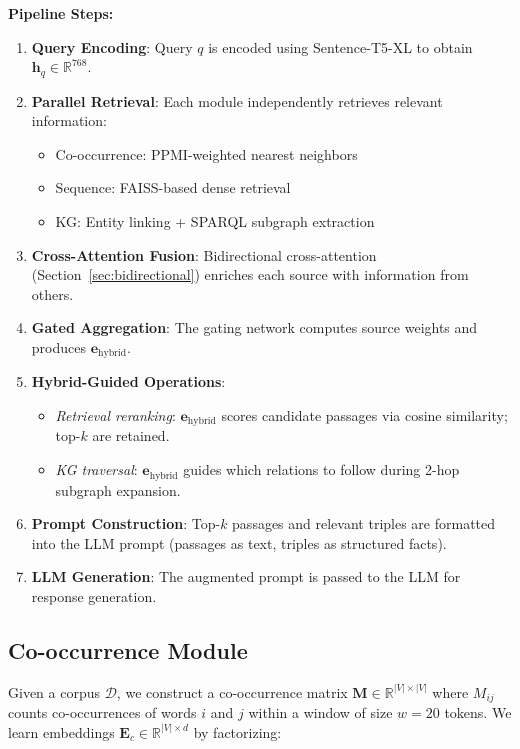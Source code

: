 \documentclass[10pt,twocolumn]{article}
\begin{document}
\textbf{Pipeline Steps:}
\begin{enumerate}
    \item \textbf{Query Encoding}: Query $q$ is encoded using Sentence-T5-XL to obtain $\mathbf{h}_q \in \mathbb{R}^{768}$.
    \item \textbf{Parallel Retrieval}: Each module independently retrieves relevant information:
    \begin{itemize}
        \item Co-occurrence: PPMI-weighted nearest neighbors
        \item Sequence: FAISS-based dense retrieval
        \item KG: Entity linking + SPARQL subgraph extraction
    \end{itemize}
    \item \textbf{Cross-Attention Fusion}: Bidirectional cross-attention (Section~\ref{sec:bidirectional}) enriches each source with information from others.
    \item \textbf{Gated Aggregation}: The gating network computes source weights and produces $\mathbf{e}_{\text{hybrid}}$.
    \item \textbf{Hybrid-Guided Operations}:
    \begin{itemize}
        \item \textit{Retrieval reranking}: $\mathbf{e}_{\text{hybrid}}$ scores candidate passages via cosine similarity; top-$k$ are retained.
        \item \textit{KG traversal}: $\mathbf{e}_{\text{hybrid}}$ guides which relations to follow during 2-hop subgraph expansion.
    \end{itemize}
    \item \textbf{Prompt Construction}: Top-$k$ passages and relevant triples are formatted into the LLM prompt (passages as text, triples as structured facts).
    \item \textbf{LLM Generation}: The augmented prompt is passed to the LLM for response generation.
\end{enumerate}


\subsection{Co-occurrence Module}

Given a corpus $\mathcal{D}$, we construct a co-occurrence matrix $\mathbf{M} \in \mathbb{R}^{|V| \times |V|}$ where $M_{ij}$ counts co-occurrences of words $i$ and $j$ within a window of size $w=20$ tokens. We learn embeddings $\mathbf{E}_c \in \mathbb{R}^{|V| \times d}$ by factorizing:
\end{document}
